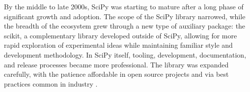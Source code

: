 \documentclass[fleqn,10pt]{wlscirep}
\begin{document}
%
%
%
%
%
%
%
%
%
%
%
%
%
%
%
%
%
%
%
%
%
%
%
%
%
%


By the middle to late 2000s, SciPy was starting to mature after a long phase of significant
growth and adoption. The scope of the SciPy library
narrowed, while the breadth of the ecosystem grew
through a new type of auxiliary package: the
scikit\cite{scikits-general}, a complementary library
developed outside of SciPy, allowing for more rapid exploration of
experimental ideas while maintaining familiar style and development methodology.
In SciPy itself, tooling, development, documentation, and release processes became more professional.
The library was expanded carefully, with the patience affordable in open source
projects and via best practices common in industry \cite{millman2014developing}.
\end{document}
